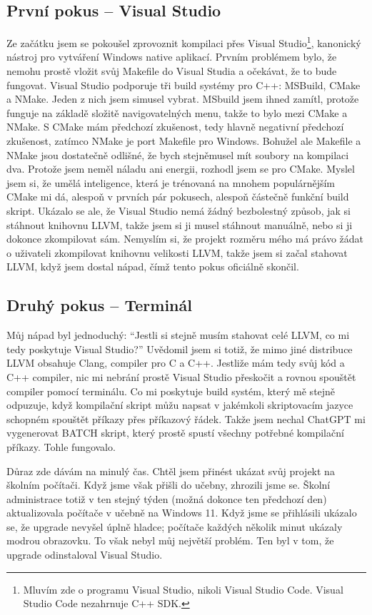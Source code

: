 \documentclass[12pt, a4paper, titlepage, abstract=on]{scrreprt}
\begin{document}
\subsection{První pokus -- Visual Studio}
Ze začátku jsem se pokoušel zprovoznit kompilaci přes Visual Studio\footnote{Mluvím zde o programu Visual Studio, nikoli Visual Studio Code. Visual Studio Code
nezahrnuje C++ SDK.}, kanonický nástroj pro vytváření Windows native aplikací. Prvním problémem bylo, že nemohu prostě vložit svůj Makefile do
Visual Studia a očekávat, že to bude fungovat. Visual Studio podporuje tři build systémy pro C++: MSBuild, CMake a NMake. Jeden z nich jsem simusel vybrat.
MSbuild jsem ihned zamítl, protože funguje na základě složitě navigovatelných menu, takže to bylo mezi CMake a NMake. S CMake mám předchozí zkušenost,
tedy hlavně negativní předchozí zkušenost, zatímco NMake je port Makefile pro Windows. Bohužel ale Makefile a NMake jsou dostatečně odlišné,
že bych stejněmusel mít soubory na kompilaci dva. Protože jsem neměl náladu ani energii, rozhodl jsem se pro CMake. Myslel jsem si, že umělá inteligence,
která je trénovaná na mnohem populárnějším CMake mi dá, alespoň v prvních pár pokusech, alespoň částečně funkční build skript. Ukázalo se ale,
že Visual Studio nemá žádný bezbolestný způsob, jak si stáhnout knihovnu LLVM, takže jsem si ji musel stáhnout manuálně, nebo si ji dokonce zkompilovat sám.
Nemyslím si, že projekt rozměru mého má právo žádat o uživateli zkompilovat knihovnu velikosti LLVM, takže jsem si začal stahovat LLVM,
když jsem dostal nápad, čímž tento pokus oficiálně skončil.

\subsection{Druhý pokus -- Terminál}
Můj nápad byl jednoduchý: \enquote{Jestli si stejně musím stahovat celé LLVM, co mi tedy poskytuje Visual Studio?} Uvědomil jsem si totiž,
že mimo jiné distribuce LLVM obsahuje Clang, compiler pro C a C++. Jestliže mám tedy svůj kód a C++ compiler, nic mi nebrání prostě Visual Studio
přeskočit a rovnou spouštět compiler pomocí terminálu. Co mi poskytuje build systém, který mě stejně odpuzuje, když kompilační skript můžu napsat
v jakémkoli skriptovacím jazyce schopném spouštět příkazy přes příkazový řádek. Takže jsem nechal ChatGPT mi vygenerovat BATCH skript, který
prostě spustí všechny potřebné kompilační příkazy. Tohle fungovalo.

Důraz zde dávám na minulý čas. Chtěl jsem přinést ukázat svůj projekt na školním počítači. Když jsme však přišli do učebny, zhrozili jsme se.
Školní administrace totiž v ten stejný týden (možná dokonce ten předchozí den) aktualizovala počítače v učebně na Windows 11. Když jsme se
přihlásili ukázalo se, že upgrade nevyšel úplně hladce; počítače každých několik minut ukázaly modrou obrazovku. To však nebyl můj největší
problém. Ten byl v tom, že upgrade odinstaloval Visual Studio.
\end{document}
